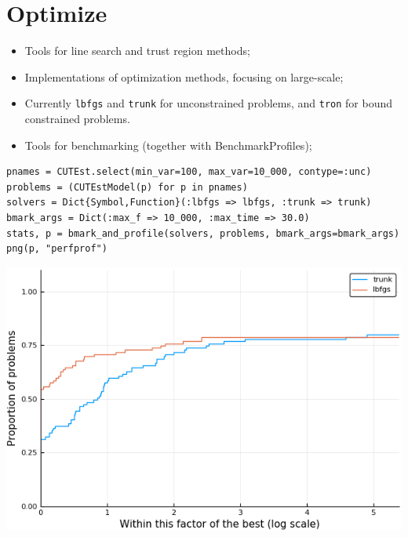 \section{Optimize}

\begin{frame}[fragile,t]
  \begin{itemize}
    \item Tools for line search and trust region methods;
    \item Implementations of optimization methods, focusing on large-scale;
    \item Currently \verb+lbfgs+ and \verb+trunk+ for unconstrained problems,
      and \verb+tron+ for bound constrained problems.
    \item Tools for benchmarking (together with BenchmarkProfiles);
  \end{itemize}
\begin{lstlisting}
pnames = CUTEst.select(min_var=100, max_var=10_000, contype=:unc)
problems = (CUTEstModel(p) for p in pnames)
solvers = Dict{Symbol,Function}(:lbfgs => lbfgs, :trunk => trunk)
bmark_args = Dict(:max_f => 10_000, :max_time => 30.0)
stats, p = bmark_and_profile(solvers, problems, bmark_args=bmark_args)
png(p, "perfprof")
\end{lstlisting}
\end{frame}

\begin{frame}[fragile,t]
  \begin{center}
    \includegraphics[height=0.75\textheight]{src/perfprof.png}
  \end{center}
\end{frame}

